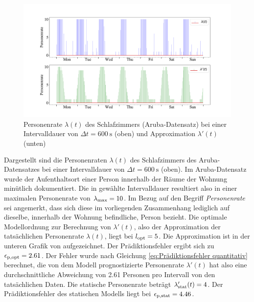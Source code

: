 \begin{figure}[!h]
	\begin{center}
		\includegraphics[width=\linewidth]{Abbildungen/evaluation/bin_size_influence_master_bedroom_float_600.pdf}
		\caption[Personenrate $\lambda (t)$  des Schlafzimmers (Aruba Datensatz) bei einer Intervalldauer von  $\Delta t = \SI{600}{\second}$ und Approximation $\lambda '(t)$]{Personenrate $\lambda (t)$  des Schlafzimmers (Aruba-Datensatz) bei einer Intervalldauer von  $\Delta t = \SI{600}{\second}$ (oben) und Approximation $\lambda '(t)$ (unten)}
		\label{fig.bin_size_influence_master_bedroom_float_600}
	\end{center}
\end{figure}

Dargestellt sind die Personenraten $\lambda (t)$ des Schlafzimmers des Aruba-Datensatzes  bei einer Intervalldauer von $\Delta t = \SI{600}{\second}$ (oben). Im Aruba-Datensatz wurde der Aufenthaltsort einer Person innerhalb der Räume der Wohnung minütlich dokumentiert. Die in  gewählte Intervalldauer resultiert also in einer maximalen Personenrate von $\lambda_{\mathrm{max}} = 10$. Im Bezug auf den Begriff \textit{Personenrate} sei angemerkt, dass sich diese im vorliegenden Zusammenhang lediglich auf dieselbe, innerhalb der Wohnung befindliche, Person bezieht.  Die optimale Modellordnung zur Berechnung von $\lambda '(t)$, also der Approximation der tatsächlichen Personenrate $\lambda(t)$, liegt bei $l_{\mathrm{opt}}=5$. Die Approximation ist in der unteren Grafik von  aufgezeichnet. Der Prädiktionsfehler  ergibt sich zu $\epsilon_{\mathrm{p,opt}} = 2.61$. Der Fehler wurde nach Gleichung \ref{eq:Prädiktionsfehler quantitativ} berechnet, die von dem Modell prognostizierte Personenrate $\lambda ' (t) $ hat also eine durchschnittliche Abweichung von 2.61 Personen pro Intervall von den tatsächlichen Daten. Die statische Personenrate beträgt $\lambda_{\mathrm{stat}} ' (t) = 4$. Der Prädiktionsfehler des statischen Modells liegt bei $\epsilon_{\mathrm{p,stat}} = 4.46$.

